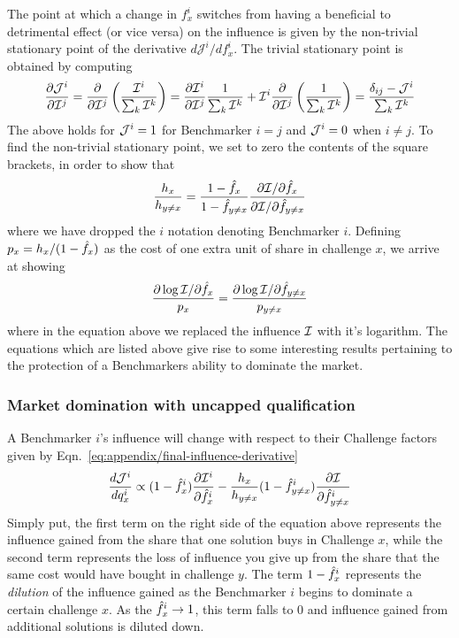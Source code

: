 The point at which a change in $f^i_x$ switches from having a beneficial to detrimental effect (or vice versa) on the influence is given by the non-trivial stationary point of the derivative $d \mathcal{J}^i/ d f^i_x$.
The trivial stationary point is obtained by computing
\begin{equation}
\frac{\partial \mathcal{J}^i}{\partial \mathcal{I}^j} = \frac{\partial }{\partial \mathcal{I}^j} \left( \frac{\mathcal{I}^i}{\sum_k \mathcal{I}^k} \right) = \frac{\partial \mathcal{I}^i}{\partial \mathcal{I}^j} \frac{1}{\sum_k \mathcal{I}^k} + \mathcal{I}^i \frac{\partial }{\partial \mathcal{I}^j}\left(\frac{1}{\sum_k \mathcal{I}^k}\right) = \frac{\delta_{ij} - \mathcal{J}^i}{\sum_k \mathcal{I}^k}  
\end{equation}
The above holds for $\mathcal{J}^i = 1$ for Benchmarker $i = j$ and $\mathcal{J}^i = 0$ when $i \neq j$.  
To find the non-trivial stationary point, we set to zero the contents of the square brackets, in order to show that 
\begin{equation}
	\frac{h_x}{h_{y \neq x}} = \frac{1 - \hat{f}_x}{1 - \hat{f}_{y \neq x}} \frac{\partial \mathcal{I} / \partial \hat{f}_x}{\partial \mathcal{I} / \partial \hat{f}_{y \neq x}}
\end{equation}
where we have dropped the $i$ notation denoting Benchmarker $i$. 
Defining $p_x = h_x / ( 1 - \hat{f}_x)$ as the cost of one extra unit of share in challenge $x$, we arrive at showing
\begin{equation}
	\frac{\partial \log \mathcal{I} / \partial \hat{f}_x}{p_x} = \frac{\partial \log \mathcal{I} / \partial \hat{f}_{y \neq x}}{p_{y \neq x}}
\end{equation}
where in the equation above we replaced the influence $\mathcal{I}$ with it's logarithm.
The equations which are listed above give rise to some interesting results pertaining to the protection of a Benchmarkers ability to dominate the market.

\subsubsection{Market domination with uncapped qualification}

A Benchmarker $i$'s influence will change with respect to their Challenge factors given by Eqn.~\ref{eq:appendix/final-influence-derivative}
\begin{equation}
\frac{d \mathcal{J}^i}{d q^i_x} \propto (1 - \hat{f}^i_x) \frac{\partial \mathcal{I}^i}{\partial \hat{f}^i_x} - \frac{h_x}{h_{y \neq x}} (1 - \hat{f}^i_{y \neq x}) \frac{\partial \mathcal{I}}{\partial \hat{f}^i_{y \neq x}}
\end{equation}
Simply put, the first term on the right side of the equation above represents the influence gained from the share that one solution buys in Challenge $x$, while the second term represents the loss of influence you give up from the share that the same cost would have bought in challenge $y$.
The term $1 - \hat{f}^i_x$ represents the \emph{dilution} of the influence gained as the Benchmarker $i$ begins to dominate a certain challenge $x$.
As the $\hat{f}^i_x \rightarrow 1$, this term falls to 0 and influence gained from additional solutions is diluted down.

